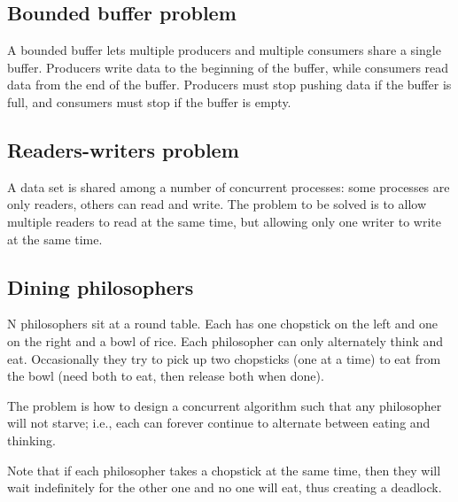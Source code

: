 \subsection{Bounded buffer problem}
A bounded buffer lets multiple producers and multiple consumers share a single buffer. Producers write data to the beginning of the buffer, while consumers read data from the end of the buffer. Producers must stop pushing data if the buffer is full, and consumers must stop if the buffer is empty.


\subsection{Readers-writers problem}
A data set is shared among a number of concurrent processes: some processes are only readers, others can read and write. The problem to be solved is to allow multiple readers to read at the same time, but allowing only one writer to write at the same time.



\subsection{Dining philosophers}
N philosophers sit at a round table. Each has one chopstick on the left and one on the right and a bowl of rice. Each philosopher can only alternately think and eat. Occasionally they try to pick up two chopsticks (one at a time) to eat from the bowl (need both to eat, then release both when done). 

The problem is how to design a concurrent algorithm such that any philosopher will not starve; i.e., each can forever continue to alternate between eating and thinking.

Note that if each philosopher takes a chopstick at the same time, then they will wait indefinitely for the other one and no one will eat, thus creating a deadlock.



